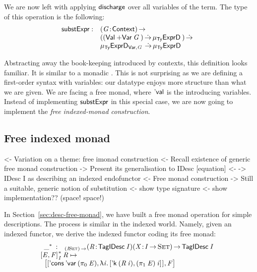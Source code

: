 \newcommand{\substH}{\F{substExpr}}

We are now left with applying $\discharge$ over all variables of the
term. The type of this operation is the following:
%
\[
\begin{array}{@{}ll}
\substH  : & \PI{\V{G}}{\Ctxt} \\
           & ((\SUM{\Val{}}{\Var{\V{G}}{}}) \DotTo
              \IMu{\Ty}{\HExprD}{}) \DotTo \\
          & \IMu{\Ty}{\HExprVarD{\V{G}}}{} \DotTo 
            \IMu{\Ty}{\HExprD}{}
\end{array}
\]

Abstracting away the book-keeping introduced by contexts, this
definition looks familiar. It is similar to a monadic \bind. This is
not surprising as we are defining a first-order syntax with variables:
our datatype enjoys more structure than what we are given. We are
facing a free monad, where $\SYMBEval$ is the \return introducing
variables. Instead of implementing $\substH$ in this special case, we
are now going to implement the \emph{free indexed-monad construction}.

\subsection{Free indexed monad}

\begin{wstructure}
<- Variation on a theme: free imonad construction
    <- Recall existence of generic free monad construction
    -> Present its generalisation to IDesc [equation]
        <- \I -> IDesc I as describing an indexed endofunctor
        <- Free monad construction
    -> Still a suitable, generic notion of substitution
        <- show type signature
        <- show implementation?? (space! space!)
\end{wstructure}

In Section~\ref{sec:desc-free-monad}, we have built a free monad
operation for simple descriptions. The process is similar in the
indexed world. Namely, given an indexed functor, we derive the indexed
functor coding its free monad: 
%
\[\stk{
\begin{array}{ll}
\FreeIMonad{\_}{} : & _{\PI{\V{I}}{\Set}}
                     \PITEL{\V{R}}{\TagIDesc{\V{I}}} 
                     \PITEL{\V{X}}{\V{I} \To \Set}\To 
                      \TagIDesc{\V{I}}
\end{array} \\
\FreeIMonad{\pair{\V{E}}{\V{F}}{}}{\V{I}}{\V{R}} \mapsto \\ \;\;
    \pair{\pair{\ListCons{\SYMBDVar}{(\fst{\V{E}})}} 
               {\LAM{\V{i}}
                \pair{\DConst{(\V{R}\: \V{i})}}
                     {(\snd{\V{E}})\: \V{i}}{}}{}}
         {\V{F}}{}
}\]


